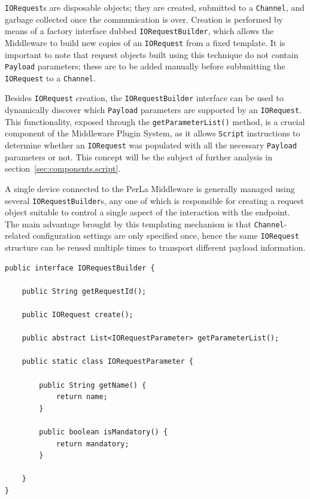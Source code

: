 \texttt{IORequest}s are disposable objects; they are created, submitted to a
\texttt{Channel}, and garbage collected once the communication is over.
Creation is performed by means of a factory interface dubbed
\texttt{IORequestBuilder}, which allows the Middleware to build new copies of
an \texttt{IORequest} from a fixed template. It is important to note that
request objects built using this technique do not contain \texttt{Payload}
parameters; these are to be added manually before subbmitting the
\texttt{IORequest} to a \texttt{Channel}.

Besides \texttt{IORequest} creation, the \texttt{IORequestBuilder} interface
can be used to dynamically discover which \texttt{Payload} parameters are
supported by an \texttt{IORequest}. This functionality, exposed through the
\texttt{getParameterList()} method, is a crucial component of the Middleware
Plugin System, as it allows \texttt{Script} instructions to determine whether
an \texttt{IORequest} was populated with all the necessary \texttt{Payload}
parameters or not. This concept will be the subject of further analysis in
section~\ref{sec:components.script}.

A single device connected to the PerLa Middleware is generally managed using
several \texttt{IORequestBuilder}s, any one of which is responsible for
creating a request object suitable to control a single aspect of
the interaction with the endpoint. The main advantage brought by this
templating mechanism is that \texttt{Channel}-related configuration settings
are only specified once, hence the same \texttt{IORequest} structure can be
reused multiple times to transport different payload information.

\lstset{language=Java}
\begin{lstlisting}[float,floatplacement=!hbt,caption=The IORequestBuilder
interface,label={lst:iorequestbuilder}]
public interface IORequestBuilder {

	public String getRequestId();

	public IORequest create();

	public abstract List<IORequestParameter> getParameterList();

	public static class IORequestParameter {

		public String getName() {
			return name;
		}

		public boolean isMandatory() {
			return mandatory;
		}

	}
}
\end{lstlisting}

